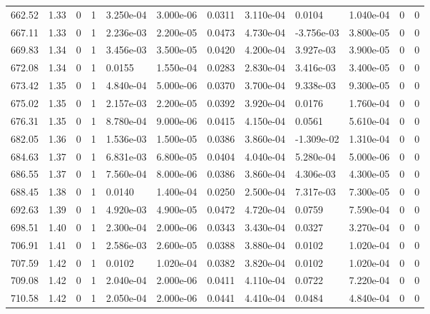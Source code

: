 \documentclass[preview]{standalone}
\begin{document}
{{{{{{{{{{{{{{{{{\begin{tabular}{L{1.2cm}C{1.2cm} C{0.3cm}C{0.5cm} C{1.4cm}C{1.4cm} C{1.4cm}C{1.4cm} C{1.6cm}C{1.6cm} C{1.6cm}C{1.6cm}}
  662.52  &  1.33  & 0     &  1 &  3.250e-04  & 3.000e-06  &  0.0311&   3.110e-04& 0.0104 & 1.040e-04   &  0 & 0  \\ 
  667.11  &  1.33  & 0     &  1 &  2.236e-03  & 2.200e-05  &  0.0473&   4.730e-04& -3.756e-03 & 3.800e-05   &  0 & 0  \\ 
  669.83  &  1.34  & 0     &  1 &  3.456e-03  & 3.500e-05  &  0.0420&   4.200e-04& 3.927e-03 & 3.900e-05   &  0 & 0  \\ 
  672.08  &  1.34  & 0     &  1 &  0.0155  & 1.550e-04  &  0.0283&   2.830e-04& 3.416e-03 & 3.400e-05   &  0 & 0  \\ 
  673.42  &  1.35  & 0     &  1 &  4.840e-04  & 5.000e-06  &  0.0370&   3.700e-04& 9.338e-03 & 9.300e-05   &  0 & 0  \\ 
  675.02  &  1.35  & 0     &  1 &  2.157e-03  & 2.200e-05  &  0.0392&   3.920e-04& 0.0176 & 1.760e-04   &  0 & 0  \\ 
  676.31  &  1.35  & 0     &  1 &  8.780e-04  & 9.000e-06  &  0.0415&   4.150e-04& 0.0561 & 5.610e-04   &  0 & 0  \\ 
  682.05  &  1.36  & 0     &  1 &  1.536e-03  & 1.500e-05  &  0.0386&   3.860e-04& -1.309e-02 & 1.310e-04   &  0 & 0  \\ 
  684.63  &  1.37  & 0     &  1 &  6.831e-03  & 6.800e-05  &  0.0404&   4.040e-04& 5.280e-04 & 5.000e-06   &  0 & 0  \\ 
  686.55  &  1.37  & 0     &  1 &  7.560e-04  & 8.000e-06  &  0.0386&   3.860e-04& 4.306e-03 & 4.300e-05   &  0 & 0  \\ 
  688.45  &  1.38  & 0     &  1 &  0.0140  & 1.400e-04  &  0.0250&   2.500e-04& 7.317e-03 & 7.300e-05   &  0 & 0  \\ 
  692.63  &  1.39  & 0     &  1 &  4.920e-03  & 4.900e-05  &  0.0472&   4.720e-04& 0.0759 & 7.590e-04   &  0 & 0  \\ 
  698.51  &  1.40  & 0     &  1 &  2.300e-04  & 2.000e-06  &  0.0343&   3.430e-04& 0.0327 & 3.270e-04   &  0 & 0  \\ 
  706.91  &  1.41  & 0     &  1 &  2.586e-03  & 2.600e-05  &  0.0388&   3.880e-04& 0.0102 & 1.020e-04   &  0 & 0  \\ 
  707.59  &  1.42  & 0     &  1 &  0.0102  & 1.020e-04  &  0.0382&   3.820e-04& 0.0102 & 1.020e-04   &  0 & 0  \\ 
  709.08  &  1.42  & 0     &  1 &  2.040e-04  & 2.000e-06  &  0.0411&   4.110e-04& 0.0722 & 7.220e-04   &  0 & 0  \\ 
  710.58  &  1.42  & 0     &  1 &  2.050e-04  & 2.000e-06  &  0.0441&   4.410e-04& 0.0484 & 4.840e-04   &  0 & 0  \\ 

\end{tabular}}}}}}}}}}}}}}}}}}
\end{document}
